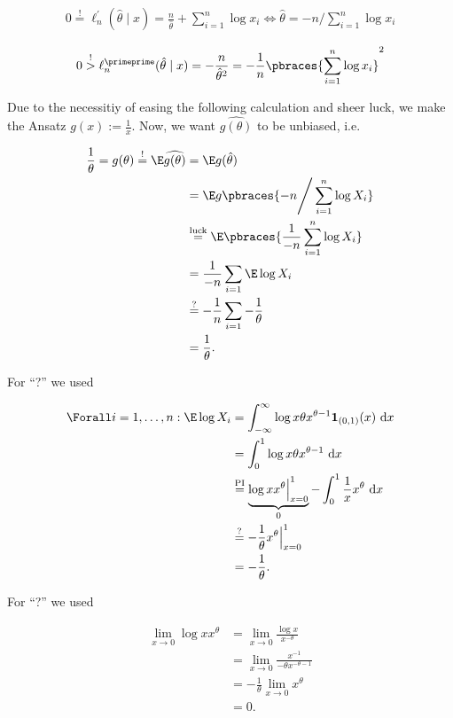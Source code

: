 \begin{solution}
\begin{align*}
    0
    \stackrel{!}{=}
    \ell_n^\prime(\hat \theta \mid x)
    =
    \frac{n}{\hat \theta} + \sum_{i=1}^n \log x_i
    \iff
    \hat \theta = -n \Bigg / \sum_{i=1}^n \log x_i
\end{align*}

\begin{align*}
    0
    \stackrel{!}{>}
    \ell_n^\primeprime(\hat \theta \mid x)
    =
    -\frac{n}{\hat \theta^2}
    =
    -\frac{1}{n}
    \pbraces
    {
        \sum_{i=1}^n \log x_i
    }^2
\end{align*}

Due to the necessitiy of easing the following calculation and sheer luck, we make the Ansatz $g(x) := \frac{1}{x}$.
Now, we want $\widehat{g(\theta)}$ to be unbiased, i.e.

\begin{align*}
    \frac{1}{\theta}
    =
    g(\theta)
    \stackrel{!}{=}
    \E \widehat{g(\theta)}
    & =
    \E g(\hat \theta) \\
    & =
    \E g \pbraces{-n \Bigg / \sum_{i=1}^n \log X_i} \\
    & \stackrel
    {
        \text{luck}
    }{=}
    \E \pbraces{\frac{1}{-n} \sum_{i=1}^n \log X_i} \\
    & =
    \frac{1}{-n} \sum_{i=1} \E \log X_i \\
    & \stackrel{?}{=}
    -\frac{1}{n} \sum_{i=1} -\frac{1}{\theta} \\
    & =
    \frac{1}{\theta}.
\end{align*}

For \enquote ? we used

\begin{align*}
    \Forall i = 1, \dots, n:
        \E \log X_i
        & =
        \int_{-\infty}^\infty
            \log x \theta x^{\theta - 1} \mathbf 1_{(0, 1)}(x)
            ~ \mathrm d x \\
        & =
        \int_0^1
            \log x \theta x^{\theta - 1}
            ~ \mathrm d x \\
        & \stackrel
        {
            \text{PI}
        }{=}
        \underbrace
        {
            \log x x^\theta \Big |_{x=0}^1
        }_0
        -
        \int_0^1
            \frac{1}{x} x^\theta
            ~ \mathrm d x \\
        & \stackrel{?}{=}
        -\frac{1}{\theta} x^\theta \Big |_{x=0}^1 \\
        & =
        -\frac{1}{\theta}.
\end{align*}

For \enquote ? we used

\begin{align*}
    \lim_{x \to 0}
        \log x x^\theta
    & =
    \lim_{x \to 0}
        \frac{\log x}{x^{-\theta}} \\
    & =
    \lim_{x \to 0}
        \frac{x^{-1}}{- \theta x^{-\theta-1}} \\
    & =
    -\frac{1}{\theta} \lim_{x \to 0} x^\theta \\
    & =
    0.
\end{align*}

\end{solution}

